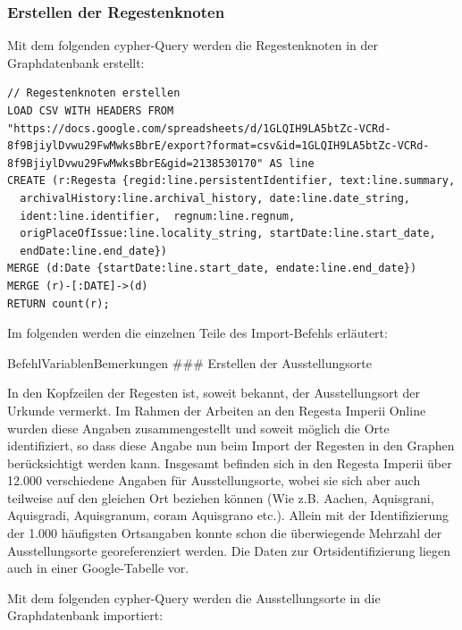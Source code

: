 \hypertarget{erstellen-der-regestenknoten}{%
\subsubsection{Erstellen der
Regestenknoten}\label{erstellen-der-regestenknoten}}

Mit dem folgenden cypher-Query werden die Regestenknoten in der
Graphdatenbank erstellt:

\begin{verbatim}
// Regestenknoten erstellen
LOAD CSV WITH HEADERS FROM "https://docs.google.com/spreadsheets/d/1GLQIH9LA5btZc-VCRd-8f9BjiylDvwu29FwMwksBbrE/export?format=csv&id=1GLQIH9LA5btZc-VCRd-8f9BjiylDvwu29FwMwksBbrE&gid=2138530170" AS line
CREATE (r:Regesta {regid:line.persistentIdentifier, text:line.summary,
  archivalHistory:line.archival_history, date:line.date_string,
  ident:line.identifier,  regnum:line.regnum,
  origPlaceOfIssue:line.locality_string, startDate:line.start_date,
  endDate:line.end_date})
MERGE (d:Date {startDate:line.start_date, endate:line.end_date})
MERGE (r)-[:DATE]->(d)
RETURN count(r);
\end{verbatim}

Im folgenden werden die einzelnen Teile des Import-Befehls erläutert:

\textbar Befehl\textbar Variablen\textbar Bemerkungen\textbar{} \#\#\#
Erstellen der Ausstellungsorte

In den Kopfzeilen der Regesten ist, soweit bekannt, der Ausstellungsort
der Urkunde vermerkt. Im Rahmen der Arbeiten an den Regesta Imperii
Online wurden diese Angaben zusammengestellt und soweit möglich die Orte
identifiziert, so dass diese Angabe nun beim Import der Regesten in den
Graphen berücksichtigt werden kann. Insgesamt befinden sich in den
Regesta Imperii über 12.000 verschiedene Angaben für Ausstellungsorte,
wobei sie sich aber auch teilweise auf den gleichen Ort beziehen können
(Wie z.B. Aachen, Aquisgrani, Aquisgradi, Aquisgranum, coram Aquisgrano
etc.). Allein mit der Identifizierung der 1.000 häufigsten Ortsangaben
konnte schon die überwiegende Mehrzahl der Ausstellungsorte
georeferenziert werden. Die Daten zur Ortsidentifizierung liegen auch in
einer Google-Tabelle vor.

Mit dem folgenden cypher-Query werden die Ausstellungsorte in die
Graphdatenbank importiert:

